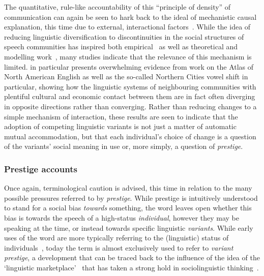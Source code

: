 The quantitative, rule-like accountability of this ``principle of density'' of communication can again be seen to hark back to the ideal of mechanistic causal explanation, this time due to external, interactional factors~\citep[p.19]{Labov2001}. While the idea of reducing linguistic diversification to discontinuities in the social structures of speech communities has inspired both empirical~\citep{Milroy1985,Herold1997,Trudgill2008} as well as theoretical and modelling work~\citep{Nettle1999,Silva2008,Gong2012,Pierrehumbert2014}, many studies indicate that the relevance of this mechanism is limited.
\citet[ch.6-10]{Labov2010} in particular presents overwhelming evidence from work on the Atlas of North American English as well as the so-called Northern Cities vowel shift in particular, showing how the linguistic systems of neighbouring communities with plentiful cultural and economic contact between them are in fact often diverging in opposite directions rather than converging. Rather than reducing changes to a simple mechanism of interaction, these results are seen to indicate that the adoption of competing linguistic variants is not just a matter of automatic mutual accommodation, but that each individual's choice of change is a question of the variants' social meaning in use or, more simply, a question of \emph{prestige}.


\subsubsection{Prestige accounts}
\label{sec:prestige}

Once again, terminological caution is advised, this time in relation to the many possible pressures referred to by \emph{prestige}. While prestige is intuitively understood to stand for a social bias \emph{towards} something, the word leaves open whether this bias is towards the speech of a high-status \emph{individual}, however they may be speaking at the time, or instead towards specific linguistic \emph{variants}. While early uses of the word are more typically referring to the (linguistic) status of individuals~\citep{Tarde1903,Fries1949}, today the term is almost exclusively used to refer to \emph{variant prestige}, a development that can be traced back to the influence of the idea of the `linguistic marketplace'~\citep{Bourdieu1977} that has taken a strong hold in sociolinguistic thinking~\citep{Cedergren1987,Chambers2008,Tagliamonte2015}.


